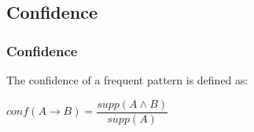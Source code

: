 
\subsection{Confidence}

\subsubsection{Confidence}

The confidence of a frequent pattern is defined as:

\(conf (A\rightarrow B)=\dfrac{supp(A\land B)}{supp(A)}\)

